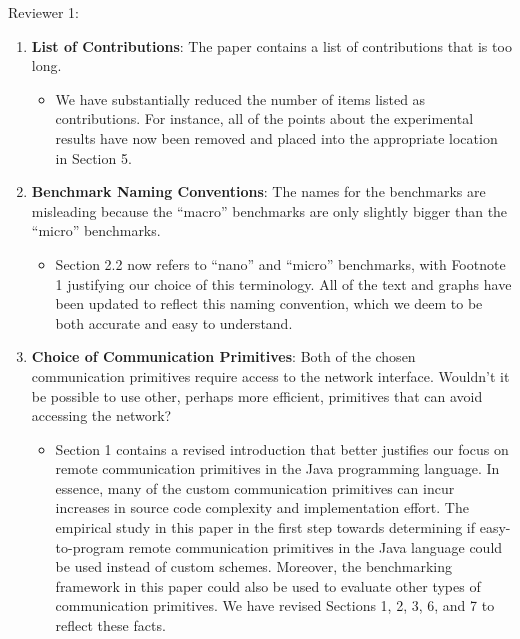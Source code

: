 \documentclass[11pt]{article}
\begin{document}
Reviewer 1: \vspace*{-.15in}
\renewcommand{\labelitemi}{$\rightarrow$}

\begin{enumerate}

  \item {\bf List of Contributions}: The paper contains a list of
    contributions that is too long. \label{item:toomany}

    \begin{itemize}
      
      \item We have substantially reduced the number of items listed
        as contributions.  For instance, all of the points about the
        experimental results have now been removed and placed into the
        appropriate location in Section 5.

    \end{itemize}

  \item {\bf Benchmark Naming Conventions}: The names for the
    benchmarks are misleading because the ``macro'' benchmarks are
    only slightly bigger than the ``micro'' benchmarks.

    \begin{itemize}
      
      \item Section 2.2 now refers to ``nano'' and ``micro''
        benchmarks, with Footnote 1 justifying our choice of this
        terminology.  All of the text and graphs have been updated to
        reflect this naming convention, which we deem to be both
        accurate and easy to understand.

    \end{itemize}

  \item {\bf Choice of Communication Primitives}: Both of the chosen
    communication primitives require access to the network interface.
    Wouldn't it be possible to use other, perhaps more efficient,
    primitives that can avoid accessing the
    network? \label{item:choice}

    \begin{itemize}
      
      \item Section 1 contains a revised introduction that better
        justifies our focus on remote communication primitives in the
        Java programming language.  In essence, many of the custom
        communication primitives can incur increases in source code
        complexity and implementation effort.  The empirical study in
        this paper in the first step towards determining if
        easy-to-program remote communication primitives in the Java
        language could be used instead of custom schemes.  Moreover,
        the benchmarking framework in this paper could also be used to
        evaluate other types of communication primitives.  We have
        revised Sections 1, 2, 3, 6, and 7 to reflect these facts.


\end{itemize}
\end{enumerate}
\end{document}
